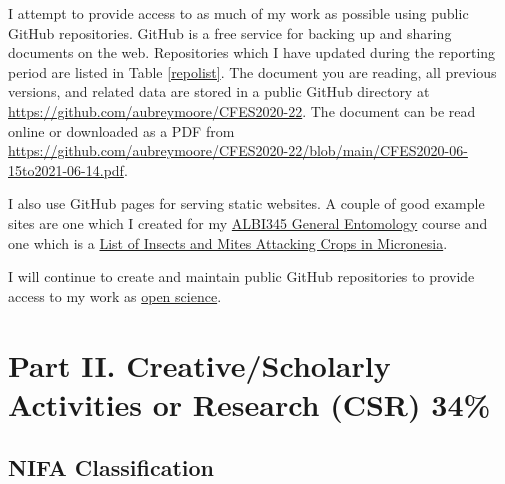I attempt to provide access to as much of my work as possible using public GitHub repositories. GitHub is a free service for backing up and sharing documents on the web. Repositories which I have updated during the reporting period are listed in Table \ref{repolist}. The document you are reading, all previous versions, and related data are stored in a public GitHub directory at \url{https://github.com/aubreymoore/CFES2020-22}. The document can be read online or downloaded as a PDF from \url{https://github.com/aubreymoore/CFES2020-22/blob/main/CFES2020-06-15to2021-06-14.pdf}.

I also use GitHub pages for serving static websites. A couple of good example sites are one which I created for my \href{https://aubreymoore.github.io/ALBI-345/}{ALBI345 General Entomology} course and one which is a \href{https://aubreymoore.github.io/crop-pest-list/}{List of Insects and Mites Attacking Crops in Micronesia}.

I will continue to create and maintain public GitHub repositories to provide access to my work as \href{https://en.wikipedia.org/wiki/Open_science}{open science}.
\begin{comment}
\paragraph{Plans for 15JUN2021-14JUN2022}
I will continue to create and maintain GitHub repositories to share my work as part of the \href{https://en.wikipedia.org/wiki/Open_science}{open science} movement.

\paragraph{Plans for 15JUN2022-14JUN2023}
I will continue to create and maintain GitHub repositories to share my work as part of the \href{https://en.wikipedia.org/wiki/Open_science}{open science} movement.
\end{comment}


\section{Part II. Creative/Scholarly Activities or Research (CSR) 34\%}

\subsection{NIFA Classification}

